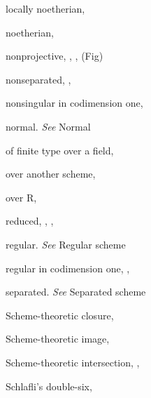 {{\noindent\hspace*{7.5bp}locally noetherian, \par
\noindent\hspace*{7.5bp}noetherian, \par
\noindent\hspace*{7.5bp}nonprojective, , ,  (Fig)\par
\noindent\hspace*{7.5bp}nonseparated, , \par
\noindent\hspace*{7.5bp}nonsingular in codimension one, \par
\noindent\hspace*{7.5bp}normal. \emph{See} Normal\par
\noindent\hspace*{7.5bp}of finite type over a field, \par
\noindent\hspace*{7.5bp}over another scheme, \par
\noindent\hspace*{7.5bp}over R, \par
\noindent\hspace*{7.5bp}reduced, , , \par
\noindent\hspace*{7.5bp}regular. \emph{See} Regular scheme\par
\noindent\hspace*{7.5bp}regular in codimension one, , \par
\noindent\hspace*{7.5bp}separated. \emph{See} Separated scheme\par
\noindent\hspace*{0.0bp}Scheme-theoretic closure, \par
\noindent\hspace*{0.0bp}Scheme-theoretic image, \par
\noindent\hspace*{0.0bp}Scheme-theoretic intersection, , \par
\noindent\hspace*{0.0bp}Schlafli's double-six, \par
}}
